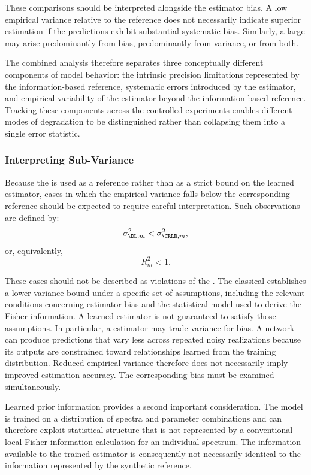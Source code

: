 These comparisons should be interpreted alongside the estimator bias. A low empirical variance relative to the \CRLB reference does not necessarily indicate superior estimation if the predictions exhibit substantial systematic bias. Similarly, a large \RMSE may arise predominantly from bias, predominantly from variance, or from both.

The combined analysis therefore separates three conceptually different components of model behavior: the intrinsic precision limitations represented by the information-based reference, systematic errors introduced by the estimator, and empirical variability of the estimator beyond the information-based reference. Tracking these components across the controlled \MC experiments enables different modes of degradation to be distinguished rather than collapsing them into a single error statistic.

\subsubsection{Interpreting Sub-\CRLB \DL Variance}
\label{sec:Analy&Visual:subsec:infoStand:subsubsec:subcrlb var}
Because the \CRLB is used as a reference rather than as a strict bound on the learned estimator, cases in which the empirical \DL variance falls below the corresponding \CRLB reference should be expected to require careful interpretation. Such observations are defined by:
\begin{equation}
    \sigma_{\DL,m}^2 < \sigma_{\CRLB,m}^2,
\end{equation}
or, equivalently,
\begin{equation}
    R_m^2 < 1.
\end{equation}

These cases should not be described as violations of the \CRLB. The classical \CRLB establishes a lower variance bound under a specific set of assumptions, including the relevant conditions concerning estimator bias and the statistical model used to derive the Fisher information. A learned estimator is not guaranteed to satisfy those assumptions. In particular, a \DL estimator may trade variance for bias. A network can produce predictions that vary less across repeated noisy realizations because its outputs are constrained toward relationships learned from the training distribution. Reduced empirical variance therefore does not necessarily imply improved estimation accuracy. The corresponding bias must be examined simultaneously.

Learned prior information provides a second important consideration. The \DL model is trained on a distribution of spectra and parameter combinations and can therefore exploit statistical structure that is not represented by a conventional local Fisher information calculation for an individual spectrum. The information available to the trained estimator is consequently not necessarily identical to the information represented by the synthetic \CRLB reference.

